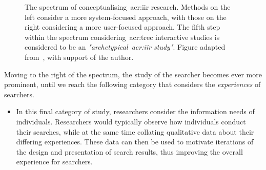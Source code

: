\begin{itemize}
\end{itemize}

\begin{figure}[t!]
    \centering
    \caption[The spectrum of~\gls{acr:ir} and~\gls{acr:iir} research (as per~\citep{kelly2009iir})]{The spectrum of conceptualising~\gls{acr:iir} research. Methods on the left consider a more system-focused approach, with those on the right considering a more user-focused approach. The fifth step within the spectrum considering~\gls{acr:trec} interactive studies is considered to be an \emph{"archetypical~\gls{acr:iir} study"}. Figure adapted from~\cite{kelly2009iir}, with support of the author.}
    \label{fig:spectrum}
\end{figure}

Moving to the right of the spectrum, the study of the searcher becomes ever more prominent, until we reach the following category that considers the \emph{experiences} of searchers.

\begin{itemize}
    \item[]{\hspace{-6mm}  In this final category of study, researchers consider the information needs of individuals. Researchers would typically observe how individuals conduct their searches, while at the same time collating qualitative data about their differing experiences. These data can then be used to motivate iterations of the design and presentation of search results, thus improving the overall experience for searchers.}
\end{itemize}

